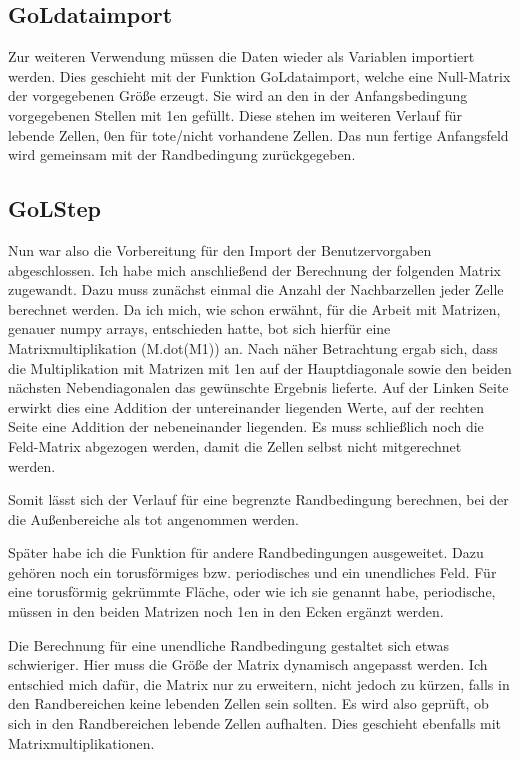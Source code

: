 \documentclass{scrartcl}
\begin{document}
\subsection{GoLdataimport}
Zur weiteren Verwendung müssen die Daten wieder als Variablen importiert werden. Dies geschieht mit der Funktion GoLdataimport, welche eine Null-Matrix der vorgegebenen Größe erzeugt. Sie wird an den in der Anfangsbedingung vorgegebenen Stellen mit 1en gefüllt. Diese stehen im weiteren Verlauf für lebende Zellen, 0en für tote/nicht vorhandene Zellen. Das nun fertige Anfangsfeld wird gemeinsam mit der Randbedingung zurückgegeben.
\subsection{GoLStep}
Nun war also die Vorbereitung für den Import der Benutzervorgaben abgeschlossen. Ich habe mich anschließend der Berechnung der folgenden Matrix zugewandt. Dazu muss zunächst einmal die Anzahl der Nachbarzellen jeder Zelle berechnet werden. Da ich mich, wie schon erwähnt, für die Arbeit mit Matrizen, genauer numpy arrays, entschieden hatte, bot sich hierfür eine Matrixmultiplikation (M.dot(M1)) an. Nach näher Betrachtung ergab sich, dass die Multiplikation mit Matrizen mit 1en auf der Hauptdiagonale sowie den beiden nächsten Nebendiagonalen das gewünschte Ergebnis lieferte. Auf der Linken Seite  erwirkt dies eine Addition der untereinander liegenden Werte, auf der rechten Seite eine Addition der nebeneinander liegenden. Es muss schließlich noch die Feld-Matrix abgezogen werden, damit die Zellen selbst nicht mitgerechnet werden.

Somit lässt sich der Verlauf für eine begrenzte Randbedingung berechnen, bei der die Außenbereiche als tot angenommen werden. 

Später habe ich die Funktion für andere Randbedingungen ausgeweitet. Dazu gehören noch ein torusförmiges bzw. periodisches und ein unendliches Feld.
Für eine torusförmig gekrümmte Fläche, oder wie ich sie genannt habe, periodische, müssen in den beiden Matrizen noch 1en in den Ecken ergänzt werden.

Die Berechnung für eine unendliche Randbedingung gestaltet sich etwas schwieriger. Hier muss die Größe der Matrix dynamisch angepasst werden. Ich entschied mich dafür, die Matrix nur zu erweitern, nicht jedoch zu kürzen, falls in den Randbereichen keine lebenden Zellen sein sollten. Es wird also geprüft, ob sich in den Randbereichen lebende Zellen aufhalten. Dies geschieht ebenfalls mit Matrixmultiplikationen. 
\end{document}
